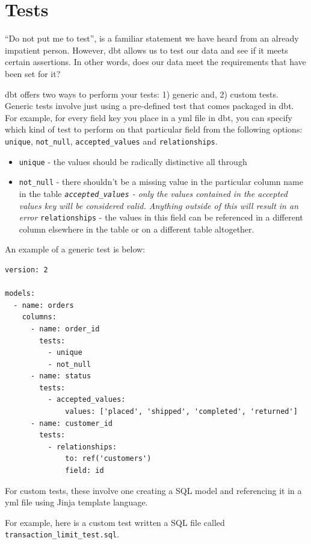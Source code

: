 \documentclass[
]{book}
\providecommand{\tightlist}{%
  \setlength{\itemsep}{0pt}\setlength{\parskip}{0pt}}
\begin{document}
\hypertarget{tests}{%
\section{Tests}\label{tests}}

``Do not put me to test'', is a familiar statement we have heard from an already impatient person. However, dbt allows us to test our data and see if it meets certain assertions. In other words, does our data meet the requirements that have been set for it?

dbt offers two ways to perform your tests: 1) generic and, 2) custom tests. Generic tests involve just using a pre-defined test that comes packaged in dbt. For example, for every field key you place in a yml file in dbt, you can specify which kind of test to perform on that particular field from the following options: \texttt{unique}, \texttt{not\_null}, \texttt{accepted\_values} and \texttt{relationships}.

\begin{itemize}
\tightlist
\item
  \texttt{unique} - the values should be radically distinctive all through
\item
  \texttt{not\_null} - there shouldn't be a missing value in the particular column name in the table
  \emph{\texttt{accepted\_values} - only the values contained in the accepted values key will be considered valid. Anything outside of this will result in an error
  }\texttt{relationships} - the values in this field can be referenced in a different column elsewhere in the table or on a different table altogether.
\end{itemize}

An example of a generic test is below:

\begin{verbatim}
version: 2

models:
  - name: orders
    columns:
      - name: order_id
        tests:
          - unique
          - not_null
      - name: status
        tests:
          - accepted_values:
              values: ['placed', 'shipped', 'completed', 'returned']
      - name: customer_id
        tests:
          - relationships:
              to: ref('customers')
              field: id
\end{verbatim}

For custom tests, these involve one creating a SQL model and referencing it in a yml file using Jinja template language.

For example, here is a custom test written a SQL file called \texttt{transaction\_limit\_test.sql}.
\end{document}
